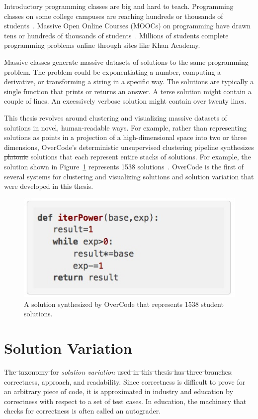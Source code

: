 \documentclass[12pt,twoside]{mitthesis}
\providecommand{\DIFaddtex}[1]{{\protect\color{blue}\uwave{#1}}} %
\providecommand{\DIFdeltex}[1]{{\protect\color{red}\sout{#1}}}                      %
\providecommand{\DIFaddbegin}{} %
\providecommand{\DIFaddend}{} %
\providecommand{\DIFdelbegin}{} %
\providecommand{\DIFdelend}{} %
\providecommand{\DIFadd}[1]{\texorpdfstring{\DIFaddtex{#1}}{#1}} %
\providecommand{\DIFdel}[1]{\texorpdfstring{\DIFdeltex{#1}}{}} %
\begin{document}
Introductory programming classes are big and hard to teach. Programming classes on some college campuses are reaching hundreds or thousands of students~\cite{biggestClass}. Massive Open Online Courses (MOOCs) on programming have drawn tens or hundreds of thousands of students~\cite{codewebs}. Millions of students complete programming problems online through sites like Khan Academy.

Massive classes generate massive datasets of solutions to the same programming problem. The problem could be exponentiating a number, computing a derivative, or transforming a string in a specific way. The solutions are typically a single function that prints or returns an answer. A terse solution might contain a couple of lines. An excessively verbose solution might contain over twenty lines.

This thesis revolves around clustering and visualizing massive datasets of solutions in novel, human-readable ways. For example, rather than representing solutions as points in a projection of a high-dimensional space into two or three dimensions, OverCode's deterministic unsupervised clustering pipeline synthesizes \DIFdelbegin \DIFdel{platonic }\DIFdelend solutions that each represent entire stacks of solutions. For example, the solution shown in Figure~\ref{largestStack} represents 1538 solutions~\cite{overcode}. OverCode is the first of several systems for clustering and visualizing solutions and solution variation that were developed in this thesis.

\begin{figure}
\centering
\includegraphics[width=0.5\linewidth]{Body/figures/overcode/largest_stack_cropped.jpg}
\caption{A solution synthesized by OverCode that represents 1538 student solutions.}
\label{largestStack}
\end{figure}

\section{Solution Variation}

\DIFdelbegin \DIFdel{The taxonomy for }\DIFdelend \DIFaddbegin \DIFadd{In this thesis, }\DIFaddend {\it solution variation} \DIFdelbegin \DIFdel{used in this thesis has three branches}\DIFdelend \DIFaddbegin \DIFadd{means three things}\DIFaddend : correctness, approach, and readability. Since correctness is difficult to prove for an arbitrary piece of code, it is approximated in industry and education by correctness with respect to a set of test cases. In education, the machinery that checks for correctness is often called an autograder.
\end{document}
